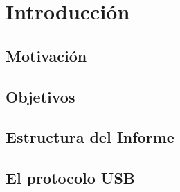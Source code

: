 \chapter{Introducción}
	\label{cap:int}
	
	\section{Motivación}
		\label{int:mot}
		
	\section{Objetivos}
		\label{int:obj}
		
	\section{Estructura del Informe}
		\label{int:est}
		
	\section{El protocolo USB}
		
 
 
%	
%	